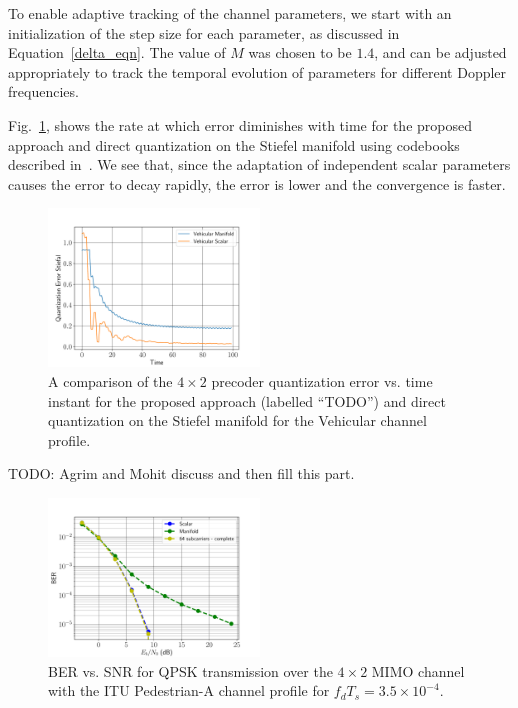 \documentclass[journal,10pt,twocolumn]{IEEEtran}
\begin{document}
To enable adaptive tracking of the channel parameters, we start with
an initialization of the step size for each parameter, as discussed in
Equation~\ref{delta_eqn}. The value of $M$ was chosen to be $1.4$, and
can be adjusted appropriately to track the temporal evolution of
parameters for different Doppler frequencies.

Fig.~\ref{fig:error_decay}, shows the rate at which error diminishes
with time for the proposed approach and direct quantization on the
Stiefel manifold using codebooks described
in~\cite{Gupt1905:Predictive}. We see that, since the adaptation of
independent scalar parameters causes the error to decay rapidly, the
error is lower and the convergence is faster.
\begin{figure}
\includegraphics[width=0.5\textwidth]{images/stief_veh.pdf}
\caption{\label{fig:error_decay}A comparison of the $4\times 2$ precoder quantization error vs. time instant for
  the proposed approach (labelled ``TODO'') and direct quantization on
the Stiefel manifold for the Vehicular channel profile.}
\end{figure}

TODO: Agrim and Mohit discuss and then fill this part.
\begin{figure}
\includegraphics[width=0.5\textwidth]{images/ber-pedestrian-35e-4}
\caption{BER vs. SNR for QPSK transmission over the $4\times 2$ MIMO
  channel with the ITU Pedestrian-A channel profile for $f_dT_s = 3.5\times 10^{-4}$.}
\label{fig:ber_ped}
\end{figure}
\end{document}
